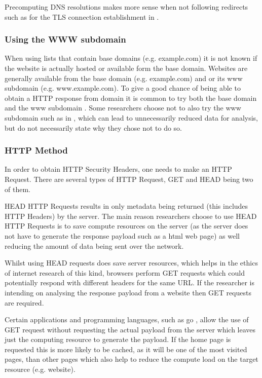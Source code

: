 \documentclass{mscreport}
\begin{document}
\vspace{0.3cm} \noindent
Precomputing DNS resolutions makes more sense when not following redirects such as for the TLS connection establishment in \cite{Amann2017-co,Holz2020-ha}.

\subsubsection{Using the WWW subdomain}

When using lists that contain base domains (e.g. example.com) it is not known if the website is actually hosted or available form the base domain. Websites are generally available from the base domain (e.g. example.com) and or its www subdomain (e.g. www.example.com). To give a good chance of being able to obtain a HTTP response from domain it is common to try both the base domain and the www subdomain \cite{Chen2016-dl,Kumar2017-qw,Ying2016-ag,Michael2015-hn}. Some researchers choose not to also try the www subdomain such as in \cite{Buchanan2018-xz,Amann2017-co}, which can lead to unnecessarily reduced data for analysis, but do not necessarily state why they chose not to do so.

\subsubsection{HTTP Method}
In order to obtain HTTP Security Headers, one needs to make an HTTP Request. There are several types of HTTP Request, GET and HEAD being two of them.

\vspace{0.3cm} \noindent
HEAD HTTP Requests results in only metadata being returned (this includes HTTP Headers) by the server. The main reason researchers choose to use HEAD HTTP Requests \cite{Amann2017-co} is to save compute resources on the server (as the server does not have to generate the response payload such as a html web page) as well reducing the amount of data being sent over the network.

\vspace{0.3cm} \noindent
Whilst using HEAD requests does save server resources, which helps in the ethics of internet research of this kind, browsers perform GET requests which could potentially respond with different headers for the same URL. If the researcher is intending on analysing the response payload from a website then GET requests \cite{Chen2016-dl,Kumar2017-qw} are required.

\vspace{0.3cm} \noindent
Certain applications and programming languages, such as go \cite{noauthor_undated-lc}, allow the use of GET request without requesting the actual payload from the server which leaves just the computing resource to generate the payload. If the home page is requested this is more likely to be cached, as it will be one of the most visited pages, than other pages which also help to reduce the compute load on the target resource (e.g. website).
\end{document}
